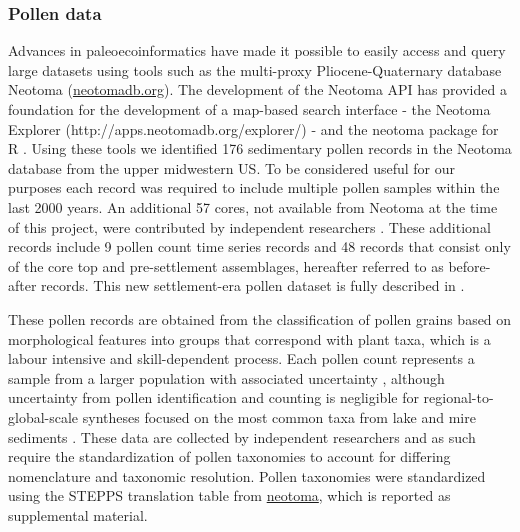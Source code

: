 \documentclass[12pt]{article}
\begin{document}


\subsubsection{Pollen data}

Advances in paleoecoinformatics \citep{brewer2012paleoecoinformatics,
  grimm2013encyclopedia} have made it possible to easily access and
query large datasets using tools such as the multi-proxy
Pliocene-Quaternary database Neotoma (\url{neotomadb.org}). The
development of the Neotoma API has provided a foundation for the
development of a map-based search interface - the Neotoma Explorer
(http://apps.neotomadb.org/explorer/) - and the neotoma package for R
\citep{goring2015}. Using these tools we identified 176 sedimentary
pollen records in the Neotoma database from the upper midwestern
US. To be considered useful for our purposes each record was required
to include multiple pollen samples within the last 2000 years.  An
additional 57 cores, not available from Neotoma at the time of this
project, were contributed by independent researchers
\citep{kujawa2015}. These additional records include 9 pollen count
time series records and 48 records that consist only of the core top
and pre-settlement assemblages, hereafter referred to as before-after
records. This new settlement-era pollen dataset is fully described in
\citet{kujawa2015}.

These pollen records are obtained from the classification of pollen
grains based on morphological features into groups that correspond
with plant taxa, which is a labour intensive and skill-dependent
process. Each pollen count represents a sample from a larger
population with associated uncertainty \citep{maher2012assessment,
  maher1981statistics}, although uncertainty from pollen
identification and counting is negligible for regional-to-global-scale
syntheses focused on the most common taxa from lake and mire sediments
\citep{webb1978sensing, webb1978mapped}. These data are collected by
independent researchers and as such require the standardization of
pollen taxonomies to account for differing nomenclature and taxonomic
resolution. Pollen taxonomies were standardized using the STEPPS
translation table from \url{neotoma}, which is reported as
supplemental material.
\end{document}
